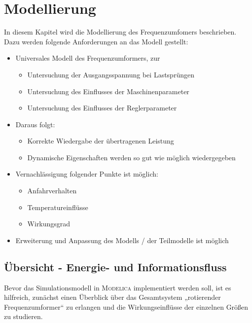 \newcommand{\dsize}{width=\textwidth, height=6cm, keepaspectratio}

\chapter{Modellierung}
\label{chap:Modellierung}
In diesem Kapitel wird die Modellierung des Frequenzumfomers beschrieben. Dazu werden folgende Anforderungen an das Modell gestellt:
\begin{itemize}
    \item Universales Modell des Frequenzumformers, zur \begin{itemize}
        \item Untersuchung der Ausgangsspannung bei Lastsprüngen
        \item Untersuchung des Einflusses der Maschinenparameter
        \item Untersuchung des Einflusses der Reglerparameter
    \end{itemize}
    \item Daraus folgt: \begin{itemize}
        \item Korrekte Wiedergabe der übertragenen Leistung
        \item Dynamische Eigenschaften werden so gut wie möglich wiedergegeben
    \end{itemize}
    \item Vernachlässigung folgender Punkte ist möglich: \begin{itemize}
        \item Anfahrverhalten
        \item Temperatureinflüsse
        \item Wirkungsgrad
    \end{itemize}
    \item Erweiterung und Anpassung des Modells / der Teilmodelle ist möglich
\end{itemize}

\section{Übersicht - Energie- und Informationsfluss}\label{sec:uxfcbersicht---energie--und-informationsfluss}

Bevor das Simulationsmodell in \textsc{Modelica} implementiert werden soll, ist es hilfreich, zunächst einen Überblick über das Gesamtsystem „rotierender Frequenzumformer“ zu erlangen und die Wirkungseinflüsse der einzelnen Größen zu studieren.

